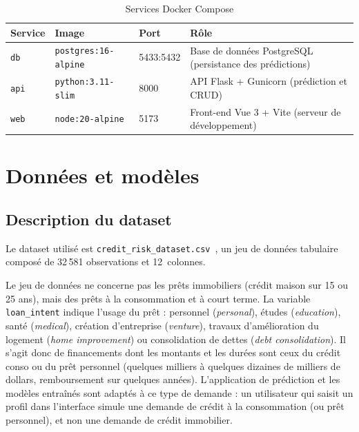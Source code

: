 \documentclass[12pt,a4paper,openany]{report}
\begin{document}
\begin{table}[H]
    \centering
    \caption{Services Docker Compose}
    \label{tab:docker-services}
    \begin{tabularx}{\textwidth}{l l l X}
        \toprule
        \textbf{Service} & \textbf{Image} & \textbf{Port} & \textbf{Rôle} \\
        \midrule
        \texttt{db}  & \texttt{postgres:16-alpine}  & 5433:5432 & Base de données PostgreSQL (persistance des prédictions) \\
        \texttt{api} & \texttt{python:3.11-slim}     & 8000 & API Flask + Gunicorn (prédiction et CRUD) \\
        \texttt{web} & \texttt{node:20-alpine}       & 5173 & Front-end Vue 3 + Vite (serveur de développement) \\
        \bottomrule
    \end{tabularx}
\end{table}


\chapter{Données et modèles}

\section{Description du dataset}

Le dataset utilisé est \texttt{credit\_risk\_dataset.csv}~\cite{kaggle-credit-risk}, un jeu de données tabulaire composé de 32\,581 observations et 12~colonnes.

Le jeu de données ne concerne pas les prêts immobiliers (crédit maison sur 15 ou 25 ans), mais des prêts à la consommation et à court terme. La variable \texttt{loan\_intent} indique l'usage du prêt : personnel (\emph{personal}), études (\emph{education}), santé (\emph{medical}), création d'entreprise (\emph{venture}), travaux d'amélioration du logement (\emph{home improvement}) ou consolidation de dettes (\emph{debt consolidation}). Il s'agit donc de financements dont les montants et les durées sont ceux du crédit conso ou du prêt personnel (quelques milliers à quelques dizaines de milliers de dollars, remboursement sur quelques années). L'application de prédiction et les modèles entraînés sont adaptés à ce type de demande : un utilisateur qui saisit un profil dans l'interface simule une demande de crédit à la consommation (ou prêt personnel), et non une demande de crédit immobilier.
\end{document}

